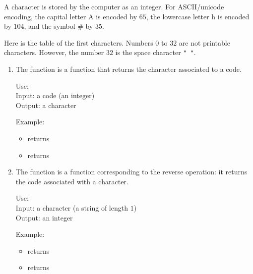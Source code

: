\documentclass[11pt,class=report,crop=false]{standalone}
\begin{document}
\begin{cours}


A character is stored by the computer as an integer.
For ASCII/unicode encoding, the capital letter \og{}A\fg{} is encoded by $65$, the lowercase letter \og{}h\fg{} is encoded by $104$, and the symbol \og{}\#\fg{} by $35$.

Here is the table of the first characters. Numbers $0$ to $32$ are not printable characters. However, the number $32$ is the space character \lstinline[showstringspaces=true]!" "!.



\begin{enumerate}  

  \item The function  is a \Python{} function that returns the character associated to a code.
  
  \begin{fonctionpython}
  Use: \\
  Input: a code (an integer)\\
  Output: a character
  
  \medskip
     
   Example:
  \begin{itemize}  
    \item {} returns 
    \item {} returns 
  \end{itemize} 
  \end{fonctionpython} 
  
  \item The function  is a \Python{} function corresponding to the reverse operation: it returns the code associated with a character.
  
  \smallskip
  
  \begin{fonctionpython}
  Use: \\
  Input: a character (a string of length $1$)\\
  Output: an integer
  
  \medskip
     
  Example:
  \begin{itemize}  
    \item {} returns 
    \item {} returns 
  \end{itemize} 
  \end{fonctionpython}  
\end{enumerate}
\end{cours}
\end{document}

